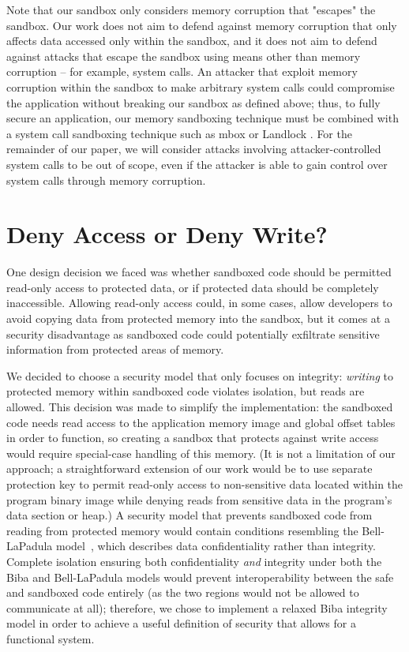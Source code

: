 Note that our sandbox only considers memory corruption that "escapes" the sandbox. Our work does not
aim to defend against memory corruption that only affects data accessed only within the sandbox, and
it does not aim to defend against attacks that escape the sandbox using means other than memory
corruption -- for example, system calls. An attacker that exploit memory corruption within the
sandbox to make arbitrary system calls could compromise the application without breaking our sandbox
as defined above; thus, to fully secure an application, our memory sandboxing technique must be
combined with a system call sandboxing technique such as mbox \cite{kim:mbox} or Landlock
\cite{linux:landlock}. For the remainder of our paper, we will consider attacks involving
attacker-controlled system calls to be out of scope, even if the attacker is able to gain control
over system calls through memory corruption.

\section{Deny Access or Deny Write?}

One design decision we faced was whether sandboxed code should be permitted read-only access to
protected data, or if protected data should be completely inaccessible. Allowing read-only access
could, in some cases, allow developers to avoid copying data from protected memory into the sandbox,
but it comes at a security disadvantage as sandboxed code could potentially exfiltrate sensitive
information from protected areas of memory.

We decided to choose a security model that only focuses on integrity: \textit{writing} to protected
memory within sandboxed code violates isolation, but reads are allowed. This decision was made to
simplify the implementation: the sandboxed code needs read access to the application memory image
and global offset tables in order to function, so creating a sandbox that protects against write
access would require special-case handling of this memory. (It is not a limitation of our approach;
a straightforward extension of our work would be to use separate protection key to permit read-only
access to non-sensitive data located within the program binary image while denying reads from
sensitive data in the program's data section or heap.) A security model that prevents sandboxed code
from reading from protected memory would contain conditions resembling the Bell-LaPadula
model~\cite{bell:confidentiality}, which describes data confidentiality rather than integrity.
Complete isolation ensuring both confidentiality \textit{and} integrity under both the Biba and
Bell-LaPadula models would prevent interoperability between the safe and sandboxed code entirely (as
the two regions would not be allowed to communicate at all); therefore, we chose to implement a
relaxed Biba integrity model in order to achieve a useful definition of security that allows for a
functional system. 

